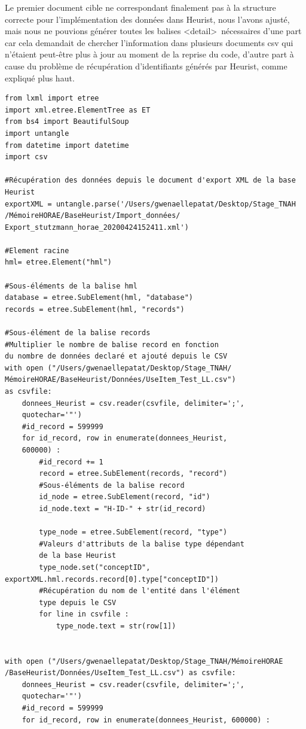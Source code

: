 \documentclass[a4paper,12pt,twoside]{book}
\begin{document}
Le premier document cible ne correspondant finalement pas à la structure correcte pour l'implémentation des données dans Heurist, nous l'avons ajusté, mais nous ne pouvions générer toutes les balises \textless detail\textgreater~nécessaires d'une part car cela demandait de chercher l'information dans plusieurs documents csv qui n'étaient peut-être plus à jour au moment de la reprise du code, d'autre part à cause du problème de récupération d'identifiants générés par Heurist, comme expliqué plus haut.
\begin{verbatim}
from lxml import etree
import xml.etree.ElementTree as ET
from bs4 import BeautifulSoup
import untangle
from datetime import datetime
import csv

#Récupération des données depuis le document d'export XML de la base Heurist
exportXML = untangle.parse('/Users/gwenaellepatat/Desktop/Stage_TNAH
/MémoireHORAE/BaseHeurist/Import_données/
Export_stutzmann_horae_20200424152411.xml')

#Element racine
hml= etree.Element("hml")

#Sous-éléments de la balise hml
database = etree.SubElement(hml, "database")
records = etree.SubElement(hml, "records")

#Sous-élément de la balise records
#Multiplier le nombre de balise record en fonction 
du nombre de données declaré et ajouté depuis le CSV
with open ("/Users/gwenaellepatat/Desktop/Stage_TNAH/
MémoireHORAE/BaseHeurist/Données/UseItem_Test_LL.csv") 
as csvfile:
    donnees_Heurist = csv.reader(csvfile, delimiter=';',
    quotechar='"')
    #id_record = 599999
    for id_record, row in enumerate(donnees_Heurist, 
    600000) :
        #id_record += 1
        record = etree.SubElement(records, "record")
        #Sous-éléments de la balise record
        id_node = etree.SubElement(record, "id")
        id_node.text = "H-ID-" + str(id_record)

        type_node = etree.SubElement(record, "type")
        #Valeurs d'attributs de la balise type dépendant 
        de la base Heurist
        type_node.set("conceptID", exportXML.hml.records.record[0].type["conceptID"])
        #Récupération du nom de l'entité dans l'élément 
        type depuis le CSV
        for line in csvfile :
            type_node.text = str(row[1])


with open ("/Users/gwenaellepatat/Desktop/Stage_TNAH/MémoireHORAE
/BaseHeurist/Données/UseItem_Test_LL.csv") as csvfile:
    donnees_Heurist = csv.reader(csvfile, delimiter=';', 
    quotechar='"')
    #id_record = 599999
    for id_record, row in enumerate(donnees_Heurist, 600000) :


\end{verbatim}
\end{document}
